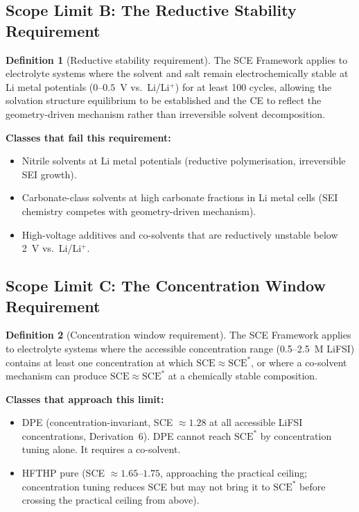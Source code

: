 \documentclass[11pt]{article}
\theoremstyle{plain}
\theoremstyle{definition}
\newtheorem{definition}{Definition}[section]
\theoremstyle{remark}
\begin{document}
\subsection{Scope Limit B: The Reductive Stability Requirement}

\begin{definition}[Reductive stability requirement]
The SCE Framework applies to electrolyte systems where the
solvent and salt remain electrochemically stable at Li metal
potentials ($0$--$0.5$~V vs.\ Li/Li$^+$) for at least
100 cycles, allowing the solvation structure equilibrium
to be established and the CE to reflect the geometry-driven
mechanism rather than irreversible solvent decomposition.
\end{definition}

\textbf{Classes that fail this requirement:}
\begin{itemize}[leftmargin=2em]
  \item Nitrile solvents at Li metal potentials (reductive
        polymerisation, irreversible SEI growth).
  \item Carbonate-class solvents at high carbonate fractions
        in Li metal cells (SEI chemistry competes with
        geometry-driven mechanism).
  \item High-voltage additives and co-solvents that are
        reductively unstable below 2~V vs.\ Li/Li$^+$.
\end{itemize}

\subsection{Scope Limit C: The Concentration Window Requirement}

\begin{definition}[Concentration window requirement]
The SCE Framework applies to electrolyte systems where the
accessible concentration range (0.5--2.5~M LiFSI) contains
at least one concentration at which $\mathrm{SCE}
\approx \mathrm{SCE}^{*}$, or where a co-solvent mechanism
can produce $\mathrm{SCE} \approx \mathrm{SCE}^{*}$ at
a chemically stable composition.
\end{definition}

\textbf{Classes that approach this limit:}
\begin{itemize}[leftmargin=2em]
  \item DPE (concentration-invariant, SCE $\approx 1.28$ at
        all accessible LiFSI concentrations, Derivation~6).
        DPE cannot reach $\mathrm{SCE}^{*}$ by concentration
        tuning alone.  It requires a co-solvent.
  \item HFTHP pure (SCE $\approx 1.65$--$1.75$, approaching
        the practical ceiling; concentration tuning reduces SCE
        but may not bring it to $\mathrm{SCE}^{*}$ before
        crossing the practical ceiling from above).
\end{itemize}
\end{document}
